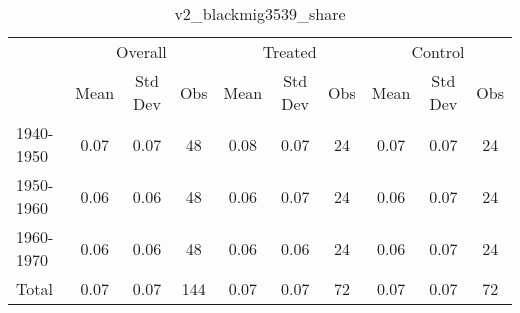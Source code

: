 \begin{table}[htbp]\centering
\def\sym#1{\ifmmode^{#1}\else\(^{#1}\)\fi}
\caption{v2\_blackmig3539\_share \label{tab1}}
\begin{tabular}{l*{3}{ccc}}
\toprule
                    &\multicolumn{3}{c}{Overall}           &\multicolumn{3}{c}{Treated}           &\multicolumn{3}{c}{Control}           \\
                    &        Mean&     Std Dev&         Obs&        Mean&     Std Dev&         Obs&        Mean&     Std Dev&         Obs\\
\midrule
1940-1950           &        0.07&        0.07&          48&        0.08&        0.07&          24&        0.07&        0.07&          24\\
1950-1960           &        0.06&        0.06&          48&        0.06&        0.07&          24&        0.06&        0.07&          24\\
1960-1970           &        0.06&        0.06&          48&        0.06&        0.06&          24&        0.06&        0.07&          24\\
Total               &        0.07&        0.07&         144&        0.07&        0.07&          72&        0.07&        0.07&          72\\
\bottomrule
\end{tabular}
\end{table}
